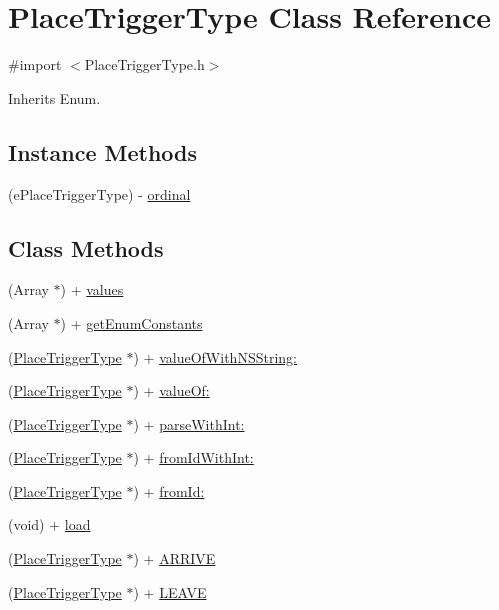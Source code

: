 \hypertarget{interface_place_trigger_type}{}\section{Place\+Trigger\+Type Class Reference}
\label{interface_place_trigger_type}


{\ttfamily \#import $<$Place\+Trigger\+Type.\+h$>$}



Inherits Enum.

\subsection*{Instance Methods}
\begin{DoxyCompactItemize}
\item 
(e\+Place\+Trigger\+Type) -\/ \hyperlink{interface_place_trigger_type_aef65ab1ab19fc2598b182cbd0645c2a5}{ordinal}
\end{DoxyCompactItemize}
\subsection*{Class Methods}
\begin{DoxyCompactItemize}
\item 
(Array $\ast$) + \hyperlink{interface_place_trigger_type_a044f75aa133869d6ee38a53771783860}{values}
\item 
(Array $\ast$) + \hyperlink{interface_place_trigger_type_a59e38db109295004005cec4bd7fc3f29}{get\+Enum\+Constants}
\item 
(\hyperlink{interface_place_trigger_type}{Place\+Trigger\+Type} $\ast$) + \hyperlink{interface_place_trigger_type_aabef016ae6c38846a999d2e83c830bce}{value\+Of\+With\+N\+S\+String\+:}
\item 
(\hyperlink{interface_place_trigger_type}{Place\+Trigger\+Type} $\ast$) + \hyperlink{interface_place_trigger_type_aebde0e98124a1f18be8536b1abbc2136}{value\+Of\+:}
\item 
(\hyperlink{interface_place_trigger_type}{Place\+Trigger\+Type} $\ast$) + \hyperlink{interface_place_trigger_type_adbe3e3a091e8a2c9a68b1cc42988ba4f}{parse\+With\+Int\+:}
\item 
(\hyperlink{interface_place_trigger_type}{Place\+Trigger\+Type} $\ast$) + \hyperlink{interface_place_trigger_type_a4d2a95308c4a78ec28af18367126d010}{from\+Id\+With\+Int\+:}
\item 
(\hyperlink{interface_place_trigger_type}{Place\+Trigger\+Type} $\ast$) + \hyperlink{interface_place_trigger_type_ad53dc507b5efeac81ea5a60f79027a98}{from\+Id\+:}
\item 
(void) + \hyperlink{interface_place_trigger_type_a187583dee5045ad26d6fb3de39aa4ada}{load}
\item 
(\hyperlink{interface_place_trigger_type}{Place\+Trigger\+Type} $\ast$) + \hyperlink{interface_place_trigger_type_a19f1a80bf4d0d2aae34e2defaefe492b}{A\+R\+R\+I\+V\+E}
\item 
(\hyperlink{interface_place_trigger_type}{Place\+Trigger\+Type} $\ast$) + \hyperlink{interface_place_trigger_type_a3337fca5ad992fb90d24a1b5adfc6a8f}{L\+E\+A\+V\+E}
\end{DoxyCompactItemize}


